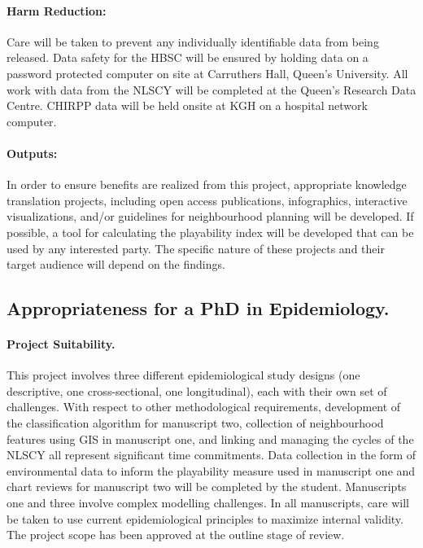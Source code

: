 \documentclass [11pt]{article}
\begin{document}
\paragraph{Harm Reduction:} Care will be taken to prevent any individually identifiable data from being released. Data safety for the HBSC will be ensured by holding data on a password protected computer on site at Carruthers Hall, Queen's University. All work with data from the NLSCY will be completed at the Queen's Research Data Centre. CHIRPP data will be held onsite at KGH on a hospital network computer. 

\paragraph{Outputs:} In order to ensure benefits are realized from this project, appropriate knowledge translation projects, including open access publications, infographics, interactive visualizations,\cite{noauthor_undated-gc} and/or guidelines for neighbourhood planning will be developed. If possible, a tool for calculating the playability index will be developed that can be used by any interested party. The specific nature of these projects and their target audience will depend on the findings.  

\subsection{Appropriateness for a PhD in Epidemiology.} 

\paragraph{Project Suitability.} This project involves three different epidemiological study designs (one descriptive, one cross-sectional, one longitudinal), each with their own set of challenges. With respect to other methodological requirements, development of the classification algorithm for manuscript two, collection of neighbourhood features using GIS in manuscript one, and linking and managing the cycles of the NLSCY all represent significant time commitments. Data collection in the form of environmental data to inform the playability measure used in manuscript one and chart reviews for manuscript two will be completed by the student. Manuscripts one and three involve complex modelling challenges. In all manuscripts, care will be taken to use current epidemiological principles to maximize internal validity. The project scope has been approved at the outline stage of review. 
\end{document}

